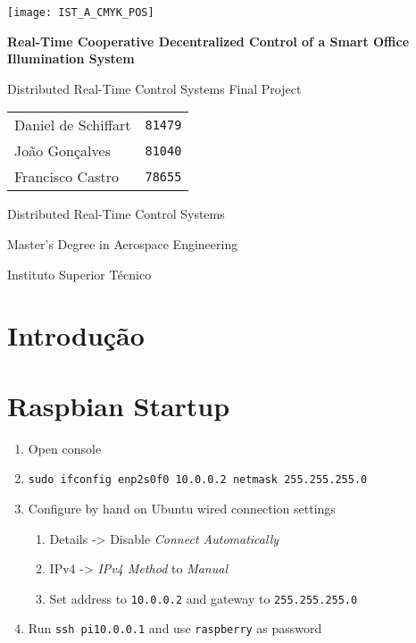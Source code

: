 \documentclass{article}
\begin{document}
\begin{titlepage}

\begin{center}
	\vspace*{0.1\textheight}
	\texttt{[image: IST\_A\_CMYK\_POS]}
	
	\vspace*{0.1\textheight}
	{\huge\bfseries Real-Time Cooperative Decentralized Control of a Smart Office Illumination System}
	
	\vspace*{0.03\textheight}
	{\Large Distributed Real-Time Control Systems Final Project}
	
	\vspace*{43.5mm}
	{\Large \begin{tabular}{l r} Daniel de Schiffart & \texttt{81479} \\ João Gonçalves & \texttt{81040} \\ Francisco Castro & \texttt{78655}\end{tabular}}
	
	\vspace{\fill}
	{\large Distributed Real-Time Control Systems}
	
	\vspace*{0.01\textheight}
	{\Large Master's Degree in Aerospace Engineering}
	
	\vspace*{0.01\textheight}
	{\large Instituto Superior Técnico}
\end{center}

\end{titlepage}
\setcounter{page}{1}

{\hypersetup{linkcolor = black} \tableofcontents}

\section{Introdução}

\section{Raspbian Startup}
\begin{enumerate}
	\item Open console
	\item \texttt{sudo ifconfig enp2s0f0 10.0.0.2 netmask 255.255.255.0}
	\item Configure by hand on Ubuntu wired connection settings
	\begin{enumerate}
		\item Details -> Disable \textit{Connect Automatically}
		\item IPv4 -> \textit{IPv4 Method} to \textit{Manual}
		\item Set address to \texttt{10.0.0.2} and gateway to \texttt{255.255.255.0}
	\end{enumerate}
	\item Run \texttt{ssh pi\@10.0.0.1} and use \texttt{raspberry} as password
\end{enumerate}
\end{document}
